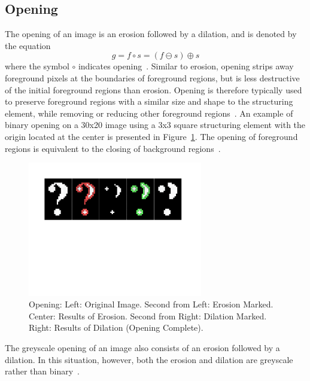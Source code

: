 \documentclass{sig-alternate}
\begin{document}
\subsection{Opening}\label{opening}
The opening of an image is an erosion followed by a dilation, and is denoted by the equation
\begin{equation*}
g = f \circ s = (f \ominus s) \oplus s
\end{equation*}
where the symbol $\circ$ indicates opening~\cite{MorphologyWikiAnonymous, MorphologyBook:2000}. Similar to erosion, opening strips away foreground pixels at the boundaries of foreground regions, but is less destructive of the initial foreground regions than erosion. Opening is therefore typically used to preserve foreground regions with a similar size and shape to the structuring element, while removing or reducing other foreground regions~\cite{MorphologyWiki}. An example of binary opening on a 30x20 image using a 3x3 square structuring element with the origin located at the center is presented in Figure~\ref{binary opening figure}. The opening of foreground regions is equivalent to the closing of background regions~\cite{MorphologyWiki}.
\begin{figure}
\centering
\includegraphics[width=3in,trim={0 4.75in 0 0},clip]{opening}
\caption{Opening: Left: Original Image. Second from Left: Erosion Marked. Center: Results of Erosion. Second from Right: Dilation Marked. Right: Results of Dilation (Opening Complete).}
\label{binary opening figure}
\end{figure}

The greyscale opening of an image also consists of an erosion followed by a dilation. In this situation, however, both the erosion and dilation are greyscale rather than binary~\cite{MorphologyPaper:1987}.
\end{document}
